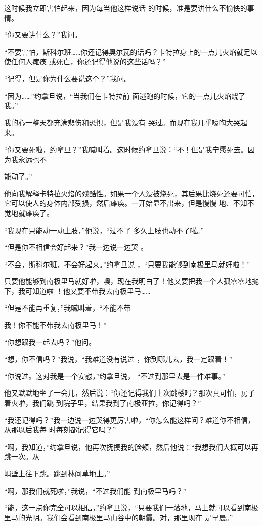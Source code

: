 \documentclass{article}
\begin{document}
这时候我立即害怕起来，因为每当他这样说话
的时候，准是要讲什么不愉快的事情。 


“你又要讲什么？”我问。 

“不要害怕，斯科尔班……你还记得奥尔瓦的话吗？卡特拉身上的一点儿火焰就足以使任何人瘫痪
或死亡，你还记得他说的这些话吗？” 


“记得，但是你为什么要说这个？”我问。 

“因为……”约拿旦说，“当我们在卡特拉前
面逃跑的时候，它的一点儿火焰烧了我。” 

我的心一整天都充满悲伤和恐惧，但是我没有
哭过。而现在我几乎嚎啕大哭起来。 

“你又要死啦，约拿旦？”我喊叫着。这时候约拿旦说：“不！但是我宁愿死去。因为我永远也不
\newpage

能动了。” 

他向我解释卡特拉火焰的残酷性。如果一个人没被烧死，其后果比烧死还要可怕，它可以使人的身体内部受损，然后瘫痪。一开始显不出来，但是慢慢
地、不知不觉地就瘫痪了。 

“我现在只能动一动上肢，”他说，“过不了
多久上肢也动不了啦。” 

“但是你不相信会好起来？”我一边说一边哭
。 

“不会，斯科尔班，不会好起来。”约拿旦说
，“只要我能够到南极里马就好啦！” 

只要他能够到南极里马就好啦，噢，现在我明白了！他又要把我一个人孤零零地抛下，我可知道啦
！他又要不带我去南极里马…… 

“但是不能再重复，”我喊叫着，“不能不带
\newpage

我！你不能不带我去南极里马！” 


“你想跟我一起去吗？”他问。 

“想，你不信吗？”我说，“我难道没有说过
，你到哪儿去，我一定跟着！” 

“你说过。这对我是一个安慰，”约拿旦说，
“不过到那里去是一件难事。” 

他又默默地坐了一会儿，然后说：“你还记得我们上次跳楼吗？那次真可怕，房子着火啦，我们跳
到院子里，结果我到了南极亚拉，你记得吗？” 

“我还记得吗？”我一边说一边哭得更厉害啦，“你怎么能这样问？难道你不相信，从那以后我每
时每刻都记得它吗？” 

“啊，我知道，”约拿旦说，他再次抚摸我的脸颊，然后他说：“我想我们大概可以再跳一次。从

\newpage
峭壁上往下跳。跳到林间草地上。” 

“啊，那我们就死啦，”我说，“不过我们能
到南极里马吗？” 

“能，这一点你完全可以相信，”约拿旦说，“只要我们一落地，马上就可以看到南极里马的光明。我们会看到南极里马山谷中的朝霞。对，那里现在
是早晨。” 
\end{document}
